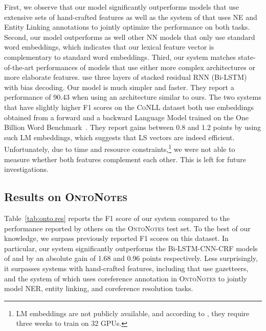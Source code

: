 \documentclass[11pt]{article}
\newcommand{\conll}{\textsc{CoNLL}}
\newcommand{\onto}{\textsc{OntoNotes}}
\newcommand{\lr}{\textsc{LS}}
\begin{document}
	First, we observe that our model significantly  outperforms models that use extensive sets of hand-crafted features \cite{ratinov2009design,lin2009phrase} as well as the system of \cite{luo-2015} that uses NE and Entity Linking annotations to jointly optimize the performance on both tasks.  Second, our model outperforms as well other NN models that only use standard word embeddings, which indicates that our lexical feature vector is complementary to standard word embeddings. 
	Third, our system matches state-of-the-art performances of models that use either more complex architectures or more elaborate features.  use three layers of stacked residual RNN (Bi-LSTM) with bias decoding. Our model is much simpler and faster. They report a performance of 90.43 when using an architecture similar to ours. The two systems that have slightly higher F1 scores on the \conll{} dataset both use embeddings obtained from a forward and a backward Language Model trained on the One Billion Word Benchmark~\cite{chelba2013one}. They report gains between 0.8 and 1.2 points by using such LM embeddings, which suggests that \lr{} vectors are indeed efficient. Unfortunately, due to time and resource constraints,\footnote{LM embeddings are not publicly available, and according to , they require three weeks to train on 32 GPUs.} we were not able to measure whether both features complement each other. This is left for future investigations. 
	
	\subsection{Results on \onto}	
	
	Table~\ref{tab:onto.res} reports the F1 score of our system compared to the performance reported by others on the \onto{} test set. To the best of our knowledge, we surpass previously reported F1 scores on this dataset. In particular, our system significantly outperforms the Bi-LSTM-CNN-CRF  models of \cite{chiu2015named} and \cite{strubell2017fast} by an absolute gain of 1.68 and 0.96 points respectively.  Less surprisingly, it surpasses systems with hand-crafted features, including  that use gazetteers, and the system of  which uses coreference annotation in \onto{} to jointly model NER, entity linking, and coreference resolution tasks. 
	
\end{document}
